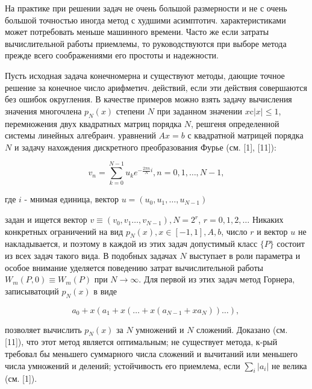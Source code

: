 \documentclass[10pt]{article}
\begin{document}
На практике при решении задач не очень большой размерности и не с очень большой точностью иногда метод с худшими асимптотич. характеристиками может потребовать меньше машинного времени. Часто же если затраты вычислительной работы приемлемы, то руководствуются при выборе метода прежде всего соображениями его простоты и надежности.



Пусть исходная задача конечномерна и существуют методы, дающие точное решение за конечное число арифметич. действий, если эти действия совершаются без ошибок округления. В качестве примеров можно взять задачу вычисления значения многочлена $p_{N}(x)$ степени $N$ при заданном значении $x \mathrm{c}|x| \leqslant 1$, перемножения двух квадратных матриц порядка $N$, решгеня определенной системы линейных алгебраич. уравнений $A x=b$ с квадратной матрицей порядка $N$ и задачу нахождения дискретного преобразования Фурье (см. [1], [11]):



\[

v_{n}=\sum_{k=0}^{N-1} u_{k} e^{-\frac{2 \pi n}{N} i}, n=0,1, \ldots, N-1,

\]



где $i$ - мнимая единица, вектор $u=\left(u_{0}, u_{1}, \ldots, u_{N-1}\right)$

задан и ищется вектор $v \equiv\left(v_{0}, v_{1} \ldots, v_{N-1}\right), N=2^{r}$, $r=0,1,2, \ldots$ Никаких конкретных ограничений на вид $p_{N}(x), x \in[-1,1], A, b$, число $r$ и вектор $u$ не накладывается, и поэтому в каждой из этих задач допустимый класс $\{P\}$ состоит из всех задач такого вида. В подобных задачах $N$ выступает в роли параметра и особое внимание уделяется поведению затрат вычислительной работы $W_{m}(P, 0) \equiv W_{m}(P)$ при $N \rightarrow \infty$. Для первой из этих задач метод Горнера, записыватоций $p_{N}(x)$ в виде



\[

a_{0}+x\left(a_{1}+x\left(\ldots+x\left(a_{N-1}+x a_{N}\right)\right) \ldots\right) \text {, }

\]



позволяет вычислить $p_{N}(x)$ за $N$ умножений и $N$ сложений. Доказано (см. [11]), что этот метод является оптимальным; не существует метода, к-рый требовал бы меньшего суммарного числа сложений и вычитаний или меньшего числа умножений и делений; устойчивость его приемлема, если $\sum_{i}\left|a_{i}\right|$ не велика (см. [1]).
\end{document}
